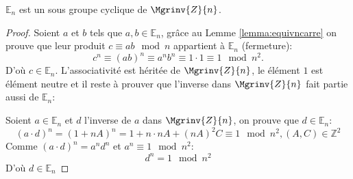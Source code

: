 		\begin{lemma} $\mathbb{E}_n$ est un sous groupe cyclique de $\Mgrinv{Z}{n}$.
			\begin{proof}
				Soient $a$ et $b$ tels que $a,b \in \mathbb{E}_n$, grâce au Lemme \ref{lemma:equivncarre} on prouve que leur produit $c \equiv ab\mod{n}$ appartient à $\mathbb{E}_n$ (fermeture):
				\begin{equation}
				c^n \equiv (ab)^n \equiv a^nb^n \equiv 1 \cdot 1 \equiv 1\mod{n^2}.
				\end{equation}
				D'où $c \in \mathbb{E}_n$.
%
			L'associativité est héritée de $\Mgrinv{Z}{n}$, le élément $1$ est élément neutre et il reste 
			à prouver que l'inverse dans $\Mgrinv{Z}{n}$ fait partie aussi de $\mathbb{E}_n$:

				Soient $a\in\mathbb{E}_n$ et $d$ l'inverse de $a$ dans $\Mgrinv{Z}{n}$, on prouve que $d \in \mathbb{E}_n$:
				\begin{equation}
					(a\cdot d)^n = (1+nA)^n = 1+n\cdot nA+ (nA)^2C \equiv 1\mod{n^2}, (A,C) \in \mathbb{Z}^2
				\end{equation}
				Comme $(a\cdot d)^n = a^nd^n$ et $a^n \equiv 1\mod{n^2}$:
				\begin{equation}
					d^n = 1\mod{n^2}
				\end{equation}
				D'où $d\in\mathbb{E}_n$
			\end{proof}
		\end{lemma}
